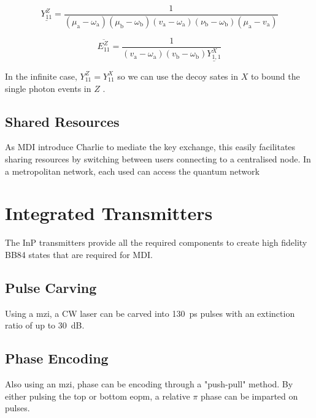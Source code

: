 \begin{equation}
	\underline{Y_{11}^Z} = \frac{1}{\left(\mu_{\mathrm{a}}-\omega_{\mathrm{a}}\right)\left(\mu_{\mathrm{b}}-\omega_{\mathrm{b}}\right)\left(v_{\mathrm{a}}-\omega_{\mathrm{a}}\right)\left(\nu_{\mathrm{b}}-\omega_{\mathrm{b}}\right)\left(\mu_{\mathrm{a}}-v_{\mathrm{a}}\right)}
\end{equation}

\begin{equation}
	\overline{E_{11}^Z} = \frac{1}{\left(v_{\mathrm{a}}-\omega_{\mathrm{a}}\right)\left(v_{\mathrm{b}}-\omega_{\mathrm{b}}\right) \underline{Y^{X}_{1,1}}}
\end{equation}

In the infinite case, $Y_{11}^Z = Y_{11}^X$ so we can use the decoy sates in $X$ to bound the single photon events in $Z$ \cite{zhou2016}. 

\subsection{Shared Resources}

As \ac{MDI} introduce Charlie to mediate the key exchange, this easily facilitates sharing resources by switching between users connecting to a centralised node. In a metropolitan network, each used can access the quantum network 

\section{Integrated Transmitters}

The \ac{InP} transmitters provide all the required components to create high fidelity BB84 states that are required for \ac{MDI}.

\subsection{Pulse Carving}

Using a \acl{mzi}, a \ac{CW} laser can be carved into \SI{130}{ps} pulses with an extinction ratio of up to \SI{30}{dB}.

\subsection{Phase Encoding}

Also using an \ac{mzi}, phase can be encoding through a "push-pull" method. By either pulsing the top or bottom \ac{eopm}, a relative $\pi$ phase can be imparted on pulses.

